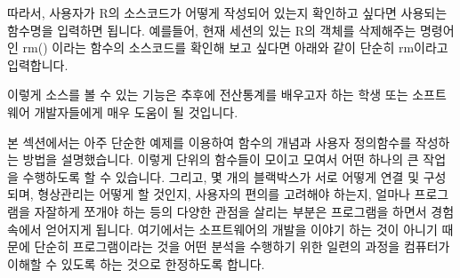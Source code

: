 따라서, 사용자가 R의 소스코드가 어떻게 작성되어 있는지 확인하고 싶다면 사용되는 함수명을 입력하면 됩니다. 
예를들어, 현재 세션의 있는 R의 객체를 삭제해주는 명령어인 rm() 이라는 함수의 소스코드를 확인해 보고 싶다면 아래와 같이 단순히 rm이라고 입력합니다.

\begin{Schunk}
\end{Schunk}

이렇게 소스를 볼 수 있는 기능은 추후에 전산통계를 배우고자 하는 학생 또는 소프트웨어 개발자들에게 매우 도움이 될 것입니다. 





본 섹션에서는 아주 단순한 예제를 이용하여 함수의 개념과 사용자 정의함수를 작성하는 방법을 설명했습니다.  
이렇게 단위의 함수들이 모이고 모여서 어떤 하나의 큰 작업을 수행하도록 할 수 있습니다. 
그리고, 몇 개의 블랙박스가 서로 어떻게 연결 및  구성되며, 형상관리는 어떻게 할 것인지, 사용자의 편의를 고려해야 하는지, 얼마나 프로그램을 자잘하게 쪼개야 하는 등의 다양한 관점을 살리는 부분은 프로그램을 하면서 경험속에서 얻어지게 됩니다.
여기에서는 소프트웨어의 개발을 이야기 하는 것이 아니기 때문에 단순히 프로그램이라는 것을 어떤 분석을 수행하기 위한 일련의 과정을 컴퓨터가 이해할 수 있도록 하는 것으로 한정하도록 합니다.


